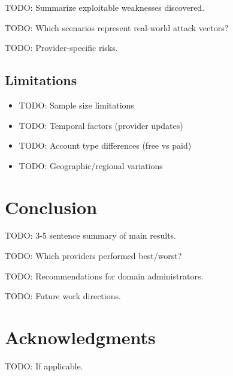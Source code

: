 \documentclass[11pt,a4paper]{article}
\begin{document}
TODO: Summarize exploitable weaknesses discovered.

TODO: Which scenarios represent real-world attack vectors?

TODO: Provider-specific risks.

\subsection{Limitations}

\begin{itemize}[noitemsep]
    \item TODO: Sample size limitations
    \item TODO: Temporal factors (provider updates)
    \item TODO: Account type differences (free vs paid)
    \item TODO: Geographic/regional variations
\end{itemize}

\section{Conclusion}

TODO: 3-5 sentence summary of main results.

TODO: Which providers performed best/worst?

TODO: Recommendations for domain administrators.

TODO: Future work directions.

\section*{Acknowledgments}

TODO: If applicable.
\end{document}

